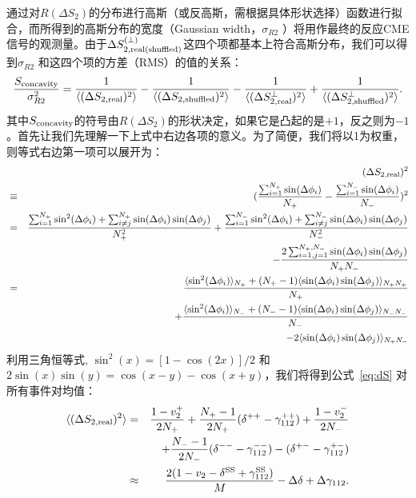 通过对$R(\Delta S_2)$的分布进行高斯（或反高斯，需根据具体形状选择）函数进行拟合，而所得到的高斯分布的宽度（Gaussian width，$\sigma_{R2}$ ）将用作最终的反应CME信号的观测量。由于$\Delta S^{(\perp)}_{2,\rm real(shuffled)}$这四个项都基本上符合高斯分布，我们可以得到$\sigma_{R2}$ 和这四个项的方差（RMS）的值的关系：
\begin{equation}
\frac{S_{\rm concavity}}{\sigma_{R2}^2}   = \frac{1}{\langle (\Delta S_{2,\rm real})^2 \rangle} - \frac{1}{\langle (\Delta S_{2,\rm shuffled})^2\rangle} - \frac{1}{\langle (\Delta S_{2,\rm real}^{\perp})^2  \rangle} + \frac{1}{\langle (\Delta S_{2,\rm shuffled}^{\perp})^2  \rangle}.
\label{eq:sigma_R2} 
\end{equation}
其中$S_{\rm concavity}$的符号由$R(\Delta S_2)$的形状决定，如果它是凸起的是$+1$，反之则为$-1$。首先让我们先理解一下上式中右边各项的意义。为了简便，我们将以1为权重，则等式右边第一项可以展开为：
\begin{eqnarray}
& &(\Delta S_{2,\rm real})^2 \nonumber \\
&\equiv& (\frac{\sum_{i=1}^{N_+}\sin(\Delta\phi_i)}{N_+}-\frac{\sum_{i=1}^{N_-}\sin(\Delta\phi_i)}{N_-})^2 \nonumber \\
&=& \frac{\sum_{i=1}^{N_+}\sin^2(\Delta\phi_i)+\sum_{i\neq j}^{N_+}\sin(\Delta\phi_i)\sin(\Delta\phi_j)}{N_+^2}+\frac{\sum_{i=1}^{N_-}\sin^2(\Delta\phi_i)+\sum_{i\neq j}^{N_-}\sin(\Delta\phi_i)\sin(\Delta\phi_j)}{N_-^2}\nonumber \\
& &-\frac{2\sum_{i=1,j=1}^{N_+,N_-}\sin(\Delta\phi_i)\sin(\Delta\phi_j)}{N_+N_-} \nonumber \\
&=& \frac{\langle \sin^2(\Delta\phi_i)\rangle_{N_+} +(N_+-1) \langle \sin(\Delta\phi_i)\sin(\Delta\phi_j)\rangle_{N_+N_+}}{N_+}  \nonumber \\
 && +\frac{\langle \sin^2(\Delta\phi_i)\rangle_{N_-} +(N_--1) \langle \sin(\Delta\phi_i)\sin(\Delta\phi_j)\rangle_{N_-N_-}}{N_-} \nonumber \\
& &-2\langle \sin(\Delta\phi_i)\sin(\Delta\phi_j) \rangle_{N_+N_-}
\label{eq:dS}
\end{eqnarray}
利用三角恒等式, $\sin^2(x) = [1-\cos(2x)]/2$ 和 $2\sin(x)\sin(y) = \cos(x-y)-\cos(x+y)$，我们将得到公式~\ref{eq:dS} 对所有事件对均值：
\begin{eqnarray}
\langle(\Delta S_{2,\rm real})^2\rangle 
&=& \frac{1-v_2^+}{2N_+} + \frac{N_+-1}{2N_+}(\delta^{++}-\gamma^{++}_{112})+\frac{1-v_2^-}{2N_-}  \nonumber \\
&&+ \frac{N_--1}{2N_-}(\delta^{--}-\gamma^{--}_{112}) - (\delta^{+-}-\gamma^{+-}_{112}) \\
&\approx& \frac{2(1-v_2-\delta^{\rm SS}+\gamma_{112}^{\rm SS})}{M} - \Delta\delta + \Delta\gamma_{112}.
\label{eq:s-expand}
\end{eqnarray}
